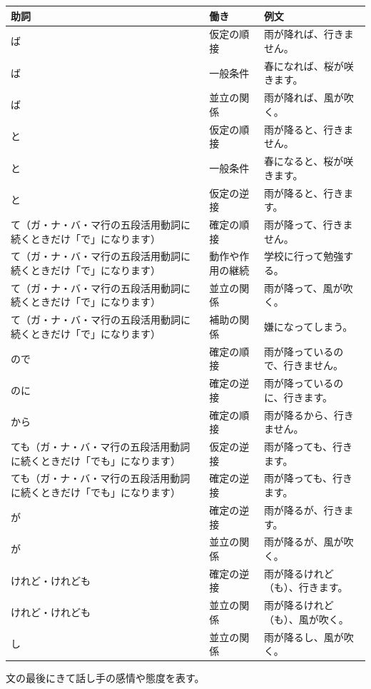 \documentclass[a4paper,12pt]{article}
\begin{document}
\begin{longtable}[c]{|C{0.15\textwidth}|C{0.35\textwidth}|C{0.35\textwidth}|}
\hline
助詞 & 働き & 例文 \\\hline\endhead
ば & 仮定の順接 & 雨が降れば、行きません。 \\\hline
ば & 一般条件 & 春になれば、桜が咲きます。 \\\hline
ば & 並立の関係 & 雨が降れば、風が吹く。 \\\hline
と & 仮定の順接 & 雨が降ると、行きません。 \\\hline
と & 一般条件 & 春になると、桜が咲きます。 \\\hline
と & 仮定の逆接 & 雨が降ると、行きます。 \\\hline
て（ガ・ナ・バ・マ行の五段活用動詞に続くときだけ「で」になります） & 確定の順接 & 雨が降って、行きません。 \\\hline
て（ガ・ナ・バ・マ行の五段活用動詞に続くときだけ「で」になります） & 動作や作用の継続 & 学校に行って勉強する。 \\\hline
て（ガ・ナ・バ・マ行の五段活用動詞に続くときだけ「で」になります） & 並立の関係 & 雨が降って、風が吹く。 \\\hline
て（ガ・ナ・バ・マ行の五段活用動詞に続くときだけ「で」になります） & 補助の関係 & 嫌になってしまう。 \\\hline
ので & 確定の順接 & 雨が降っているので、行きません。 \\\hline
のに & 確定の逆接 & 雨が降っているのに、行きます。 \\\hline
から & 確定の順接 & 雨が降るから、行きません。 \\\hline
ても（ガ・ナ・バ・マ行の五段活用動詞に続くときだけ「でも」になります） & 仮定の逆接 & 雨が降っても、行きます。 \\\hline
ても（ガ・ナ・バ・マ行の五段活用動詞に続くときだけ「でも」になります） & 確定の逆接 & 雨が降っても、行きます。 \\\hline
が & 確定の逆接 & 雨が降るが、行きます。 \\\hline
が & 並立の関係 & 雨が降るが、風が吹く。 \\\hline
けれど・けれども & 確定の逆接 & 雨が降るけれど（も）、行きます。 \\\hline
けれど・けれども & 並立の関係 & 雨が降るけれど（も）、風が吹く。 \\\hline
し & 並立の関係 & 雨が降るし、風が吹く。 \\\hline
\end{longtable}
文の最後にきて話し手の感情や態度を表す。
\end{document}
